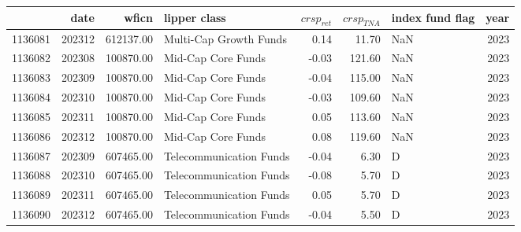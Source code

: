\begin{tabular}{lrrlrrlr}
\toprule
 & date & wficn & lipper class & $crsp_{ret}$ & $crsp_{TNA}$ & index fund flag & year \\
\midrule
1136081 & 202312 & 612137.00 & Multi-Cap Growth Funds & 0.14 & 11.70 & NaN & 2023 \\
1136082 & 202308 & 100870.00 & Mid-Cap Core Funds & -0.03 & 121.60 & NaN & 2023 \\
1136083 & 202309 & 100870.00 & Mid-Cap Core Funds & -0.04 & 115.00 & NaN & 2023 \\
1136084 & 202310 & 100870.00 & Mid-Cap Core Funds & -0.03 & 109.60 & NaN & 2023 \\
1136085 & 202311 & 100870.00 & Mid-Cap Core Funds & 0.05 & 113.60 & NaN & 2023 \\
1136086 & 202312 & 100870.00 & Mid-Cap Core Funds & 0.08 & 119.60 & NaN & 2023 \\
1136087 & 202309 & 607465.00 & Telecommunication Funds & -0.04 & 6.30 & D & 2023 \\
1136088 & 202310 & 607465.00 & Telecommunication Funds & -0.08 & 5.70 & D & 2023 \\
1136089 & 202311 & 607465.00 & Telecommunication Funds & 0.05 & 5.70 & D & 2023 \\
1136090 & 202312 & 607465.00 & Telecommunication Funds & -0.04 & 5.50 & D & 2023 \\
\bottomrule
\end{tabular}
